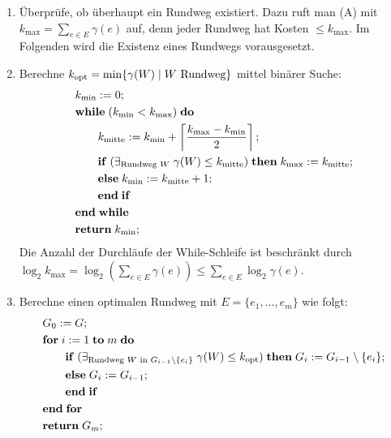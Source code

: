 \begin{Beweis}
    \begin{enumerate}
        \item
        Überprüfe, ob überhaupt ein Rundweg existiert.
        Dazu ruft man (A) mit $k_{\max} = \sum_{e \in E} \gamma(e)$ auf,
        denn jeder Rundweg hat Kosten $\le k_{\max}$.
        Im Folgenden wird die Existenz eines Rundwegs vorausgesetzt.

        \item
        Berechne $k_{\text{opt}} = \min\{\gamma(W) \;|\; W \text{ Rundweg}\}$ mittel binärer Suche:
        \begin{align*}
            &k_{\min} := 0;\\
            &\mathbf{while}\; (k_{\min} < k_{\max})\; \mathbf{do}\;\\
            &\qquad k_\text{mitte} := k_{\min} +
            \left\lceil \frac{k_{\max} - k_{\min}}{2} \right\rceil;\\
            &\qquad \mathbf{if}\; (\exists_{\text{Rundweg } W}\; \gamma(W) \le k_\text{mitte})\; \mathbf{then}\;
            k_{\max} := k_\text{mitte};\\
            &\qquad \mathbf{else}\; k_{\min} := k_\text{mitte} + 1;\\
            &\qquad \mathbf{end}\;\mathbf{if}\;\\
            &\mathbf{end}\;\mathbf{while}\;\\
            &\mathbf{return}\; k_{\min};
        \end{align*}
        Die Anzahl der Durchläufe der While-Schleife ist beschränkt durch\\
        $\log_2 k_{\max} = \log_2 (\sum_{e \in E} \gamma(e)) \le \sum_{e \in E} \log_2 \gamma(e)$.

        \item
        Berechne einen optimalen Rundweg mit $E = \{e_1, \dotsc, e_m\}$ wie folgt:
        \begin{align*}
            &G_0 := G;\\
            &\mathbf{for}\; i := 1 \;\mathbf{to}\; m \;\mathbf{do}\;\\
            &\qquad \mathbf{if}\; (\exists_{\text{Rundweg } W \text{ in } G_{i-1} \setminus \{e_i\}}\;
            \gamma(W) \le k_{\text{opt}})\; \mathbf{then}\;
            G_i := G_{i-1} \setminus \{e_i\};\\
            &\qquad \mathbf{else}\; G_i := G_{i-1};\\
            &\qquad \mathbf{end}\;\mathbf{if}\;\\
            &\mathbf{end}\;\mathbf{for}\;\\
            &\mathbf{return}\; G_m;
        \end{align*}
    \end{enumerate}
\end{Beweis}

